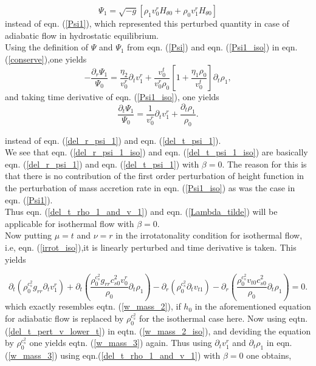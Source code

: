\documentclass[12pt]{article}
\begin{document}
\begin{equation}\label{Psi1_iso}
\Psi_1 = \sqrt{-g}[\rho_1 v_0^r H_{\theta 0}+\rho_0 v^r_1H_{\theta 0}]
\end{equation}
instead of eqn. (\ref{Psi1}), which represented this perturbed quantity in case of adiabatic flow in hydrostatic equilibrium.\\
Using the definition of $\Psi$ and $\Psi_1$ from eqn. (\ref{Psi}) and eqn. (\ref{Psi1_iso}) in eqn. (\ref{conserve}),one yields
\begin{equation}\label{del_r_psi_1_iso}
-\dfrac{\partial_r\Psi_1}{\Psi_0} = \dfrac{\eta_2}{v_0^r}\partial_t v^r_1+\dfrac{v_0^t}{v_0^r \rho_0 }\left[ 1 +\frac{\eta_1 \rho_0}{v_0^t}\right]\partial_t \rho_1,
\end{equation}
\noindent
and taking time derivative of eqn. (\ref{Psi1_iso}), one yields
\begin{equation}\label{del_t_psi_1_iso}
\dfrac{\partial_t\Psi_1}{\Psi_0} = \dfrac{1}{v_0^r}\partial_t v^r_1+ \dfrac{\partial_t \rho_1}{\rho_0}.
\end{equation}

instead of eqn. (\ref{del_r_psi_1}) and eqn. (\ref{del_t_psi_1}).\\
We see that eqn. (\ref{del_r_psi_1_iso}) and eqn. (\ref{del_t_psi_1_iso}) are basically eqn. (\ref{del_r_psi_1}) and eqn. (\ref{del_t_psi_1}) with $\beta = 0$. The reason for this is that there is no contribution of the first order perturbation of height function in the perturbation of mass accretion rate in eqn. (\ref{Psi1_iso}) as was the case in eqn. (\ref{Psi1}).\\
Thus eqn. (\ref{del_t_rho_1_and_v_1}) and eqn. (\ref{Lambda_tilde}) will be applicable for isothermal flow with $\beta = 0$.\\
Now putting $\mu = t$ and $\nu = r$ in the irrotatonality condition for isothermal flow, i.e, eqn. (\ref{irrot_iso}),it is linearly perturbed and time derivative is taken. This yields

\begin{equation}\label{w_mass_2_iso}
\partial_t\left(\rho_0^{c_s^2} g_{rr}\partial_t v^r_1 \right)+\partial_t\left( \frac{\rho_0^{c_s^2}g_{rr}c_{s0}^2 v^r_0}{\rho_0}\partial_t \rho_1\right)-\partial_r\left( \rho_0^{c_s^2}\partial_t v_{t1}\right)-\partial_r\left( \frac{\rho_0^{c_s^2} v_{t0}c_{s0}^2}{\rho_0}\partial_t \rho_1\right)=0.
\end{equation} 
 which exactly resembles eqtn. (\ref{w_mass_2}), if $h_0$ in the aforementioned equation for adiabatic flow is replaced by $\rho_0^{c_s^2}$ for the isothermal case here. Now using eqtn. (\ref{del_t_pert_v_lower_t}) in eqtn. (\ref{w_mass_2_iso}), and deviding the equation by $\rho_0^{c_s^2}$  one yields eqtn. (\ref{w_mass_3}) again. Thus using $\partial_t v^r_1$ and $\partial_t \rho_1$ in eqn.(\ref{w_mass_3}) using eqn.(\ref{del_t_rho_1_and_v_1}) with $\beta = 0$ one obtains, 
 
\end{document}
